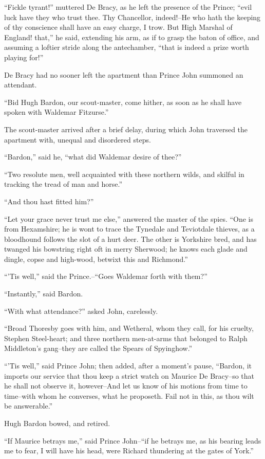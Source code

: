 ``Fickle tyrant!'' muttered De Bracy, as he left the presence of the
Prince; ``evil luck have they who trust thee. Thy Chancellor,
indeed!--He who hath the keeping of thy conscience shall have an easy
charge, I trow. But High Marshal of England! that,'' he said, extending
his arm, as if to grasp the baton of office, and assuming a loftier
stride along the antechamber, ``that is indeed a prize worth playing
for!''

De Bracy had no sooner left the apartment than Prince John summoned an
attendant.

``Bid Hugh Bardon, our scout-master, come hither, as soon as he shall
have spoken with Waldemar Fitzurse.''

The scout-master arrived after a brief delay, during which John
traversed the apartment with, unequal and disordered steps.

``Bardon,'' said he, ``what did Waldemar desire of thee?''

``Two resolute men, well acquainted with these northern wilds, and
skilful in tracking the tread of man and horse.''

``And thou hast fitted him?''

``Let your grace never trust me else,'' answered the master of the
spies. ``One is from Hexamshire; he is wont to trace the Tynedale and
Teviotdale thieves, as a bloodhound follows the slot of a hurt deer. The
other is Yorkshire bred, and has twanged his bowstring right oft in
merry Sherwood; he knows each glade and dingle, copse and high-wood,
betwixt this and Richmond.''

``'Tis well,'' said the Prince.--``Goes Waldemar forth with them?''

``Instantly,'' said Bardon.

``With what attendance?'' asked John, carelessly.

``Broad Thoresby goes with him, and Wetheral, whom they call, for his
cruelty, Stephen Steel-heart; and three northern men-at-arms that
belonged to Ralph Middleton's gang--they are called the Spears of
Spyinghow.''

``'Tis well,'' said Prince John; then added, after a moment's pause,
``Bardon, it imports our service that thou keep a strict watch on
Maurice De Bracy--so that he shall not observe it, however--And let us
know of his motions from time to time--with whom he converses, what he
proposeth. Fail not in this, as thou wilt be answerable.''

Hugh Bardon bowed, and retired.

``If Maurice betrays me,'' said Prince John--``if he betrays me, as his
bearing leads me to fear, I will have his head, were Richard thundering
at the gates of York.''
